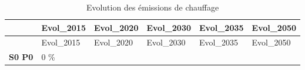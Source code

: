\documentclass[]{article}
\begin{document}
\begin{longtable}[]{@{}clllll@{}}
\caption{Evolution des émissions de chauffage}\tabularnewline
\toprule
\begin{minipage}[b]{0.18\columnwidth}\centering\strut
~\strut
\end{minipage} & \begin{minipage}[b]{0.13\columnwidth}\raggedright\strut
Evol\_2015\strut
\end{minipage} & \begin{minipage}[b]{0.13\columnwidth}\raggedright\strut
Evol\_2020\strut
\end{minipage} & \begin{minipage}[b]{0.13\columnwidth}\raggedright\strut
Evol\_2030\strut
\end{minipage} & \begin{minipage}[b]{0.13\columnwidth}\raggedright\strut
Evol\_2035\strut
\end{minipage} & \begin{minipage}[b]{0.13\columnwidth}\raggedright\strut
Evol\_2050\strut
\end{minipage}\tabularnewline
\midrule
\endfirsthead
\toprule
\begin{minipage}[b]{0.18\columnwidth}\centering\strut
~\strut
\end{minipage} & \begin{minipage}[b]{0.13\columnwidth}\raggedright\strut
Evol\_2015\strut
\end{minipage} & \begin{minipage}[b]{0.13\columnwidth}\raggedright\strut
Evol\_2020\strut
\end{minipage} & \begin{minipage}[b]{0.13\columnwidth}\raggedright\strut
Evol\_2030\strut
\end{minipage} & \begin{minipage}[b]{0.13\columnwidth}\raggedright\strut
Evol\_2035\strut
\end{minipage} & \begin{minipage}[b]{0.13\columnwidth}\raggedright\strut
Evol\_2050\strut
\end{minipage}\tabularnewline
\midrule
\endhead
\begin{minipage}[t]{0.18\columnwidth}\centering\strut
\textbf{S0 P0}\strut
\end{minipage} & \begin{minipage}[t]{0.13\columnwidth}\raggedright\strut
0 \%\strut
\end{minipage} & \begin{minipage}[t]{0.13\columnwidth}\raggedright\strut

\end{minipage}
\end{longtable}
\end{document}
